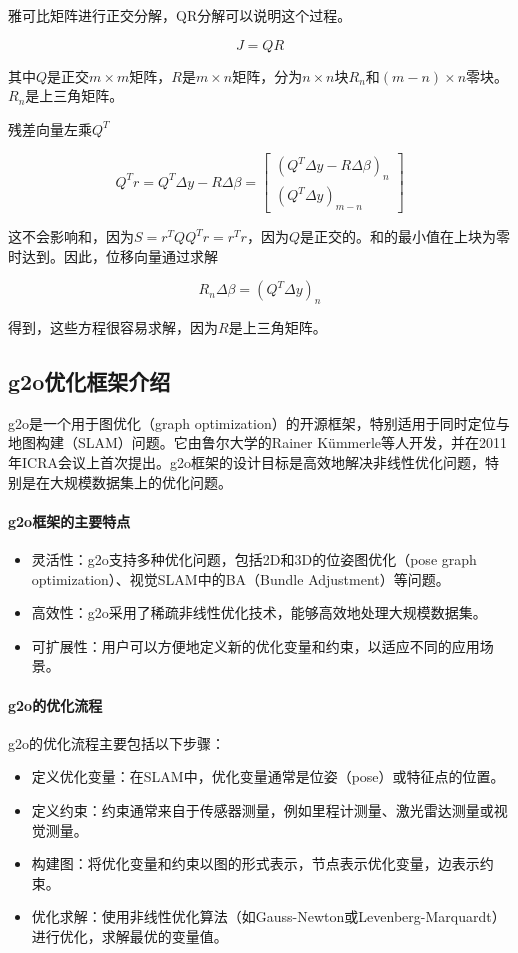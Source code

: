 \documentclass{ctexart}
\begin{document}
雅可比矩阵进行正交分解，QR分解可以说明这个过程。

\[ J = QR \]

其中$Q$是正交$m \times m$矩阵，$R$是$m \times n$矩阵，分为$n \times n$块$R_n$和$(m - n) \times n$零块。$R_n$是上三角矩阵。

残差向量左乘$Q^T$

\[ Q^T r = Q^T \Delta y - R \Delta \beta = \begin{bmatrix} (Q^T \Delta y - R \Delta \beta)_n \\ (Q^T \Delta y)_{m-n} \end{bmatrix} \]

这不会影响和，因为$S = r^T Q Q^T r = r^T r$，因为$Q$是正交的。和的最小值在上块为零时达到。因此，位移向量通过求解

\[ R_n \Delta \beta = (Q^T \Delta y)_n \]

得到，这些方程很容易求解，因为$R$是上三角矩阵。

\subsection{g2o优化框架介绍}

g2o是一个用于图优化（graph optimization）的开源框架，特别适用于同时定位与地图构建（SLAM）问题。它由鲁尔大学的Rainer Kümmerle等人开发，并在2011年ICRA会议上首次提出。g2o框架的设计目标是高效地解决非线性优化问题，特别是在大规模数据集上的优化问题。

\paragraph{g2o框架的主要特点}

\begin{itemize}
	\item 灵活性：g2o支持多种优化问题，包括2D和3D的位姿图优化（pose graph optimization）、视觉SLAM中的BA（Bundle Adjustment）等问题。
	\item 高效性：g2o采用了稀疏非线性优化技术，能够高效地处理大规模数据集。
	\item 可扩展性：用户可以方便地定义新的优化变量和约束，以适应不同的应用场景。
\end{itemize}

\paragraph{g2o的优化流程}

g2o的优化流程主要包括以下步骤：

\begin{itemize}
	\item 定义优化变量：在SLAM中，优化变量通常是位姿（pose）或特征点的位置。
	\item 定义约束：约束通常来自于传感器测量，例如里程计测量、激光雷达测量或视觉测量。
	\item 构建图：将优化变量和约束以图的形式表示，节点表示优化变量，边表示约束。
	\item 优化求解：使用非线性优化算法（如Gauss-Newton或Levenberg-Marquardt）进行优化，求解最优的变量值。
\end{itemize}
\end{document}
